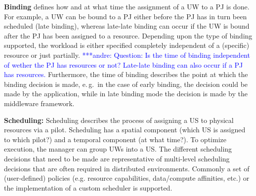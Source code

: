 \documentclass[conference,final]{IEEEtran}
\newcommand{\jhanote}[1]{ {\textcolor{red} { ***shantenu: #1 }}}
\newcommand{\alnote}[1]{ {\textcolor{blue} { ***andre: #1 }}}
\newcommand{\alnote}[1]{}
\newcommand{\jhanote}[1]{}
\begin{document}
\textbf{Binding} defines how and at what time the assignment of a
UW to a PJ is done.  For example, a UW can be bound to a
PJ either before the PJ has in turn been scheduled (late
binding), whereas late-late binding can occur if the UW is bound after
the PJ has been assigned to a resource.  Depending upon the
type of binding supported, the workload is either specified completely
independent of a (specific) resource or just partially.
\alnote{Question: Is the time of binding independent of wether the PJ
  has resources or not? Late-late binding can also occur if a PJ has
  resources.}  Furthermore, the time of binding describes the point at
which the binding decision is made, e.\,g.\ in the case of early
binding, the decision could be made by the application, while in late
binding mode the decision is made by the middleware
framework. 



\textbf{Scheduling:} Scheduling describes the process of assigning a US to
physical resources via a pilot. Scheduling has a spatial component (which US is
assigned to which pilot?) and a temporal component (at what time?). To optimize
execution, the manager can group UWs into a US. The different scheduling
decisions that need to be made are representative of multi-level scheduling
decisions that are often required in distributed environments. Commonly a set of
(user-defined) policies (e.g. resource capabilities, data/compute affinities,
etc.) or the implementation of a custom scheduler is supported.
\end{document}
